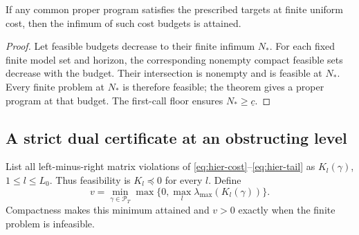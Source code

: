\begin{corollary}\label{cor:synthesis-attainment}
If any common proper program satisfies the prescribed targets at finite uniform cost, then the infimum of such cost budgets is attained.
\end{corollary}
\begin{proof}
Let feasible budgets decrease to their finite infimum $N_*$. For each fixed finite model set and horizon, the corresponding nonempty compact feasible sets decrease with the budget. Their intersection is nonempty and is feasible at $N_*$. Every finite problem at $N_*$ is therefore feasible; the theorem gives a proper program at that budget. The first-call floor ensures $N_*\ge\underline c$.
\end{proof}

\subsection{A strict dual certificate at an obstructing level}
List all left-minus-right matrix violations of \eqref{eq:hier-cost}--\eqref{eq:hier-tail} as $K_l(\gamma)$, $1\le l\le L_0$. Thus feasibility is $K_l\preccurlyeq0$ for every $l$. Define
\[
 v=\min_{\gamma\in\mathcal P_T}
       \max\{0,\max_l\lambda_{\max}(K_l(\gamma))\}.
\]
Compactness makes this minimum attained and $v>0$ exactly when the finite problem is infeasible.

